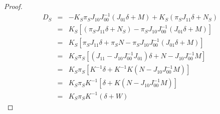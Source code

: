 \documentclass[12pt]{article}
\theoremstyle{definition}
\begin{document}
\begin{proof}
	\begin{eqnarray*}
		D_S &=& -K_S \pi_S J_{10}J_{00}^{-1}\left(J_{01}\delta + M\right) + K_S \left(\pi_S J_{11}\delta + N_S \right)\\
			&=& K_S \left[ \left(\pi_S J_{11}\delta + N_S \right) - \pi_S J_{10}J_{00}^{-1}\left(J_{01}\delta + M\right) \right]\\
			&=& K_S \left[ \pi_S J_{11}\delta + \pi_S N  - \pi_S J_{10}J_{00}^{-1}\left(J_{01}\delta + M\right) \right]\\
			&=& K_S \pi_S \left[ \left(J_{11} - J_{10}J_{00}^{-1}J_{01}\right)\delta +  N  -  J_{10}J_{00}^{-1} M \right]\\
		&=& K_S \pi_S \left[ K^{-1}\delta +K^{-1}K  \left(N  -  J_{10}J_{00}^{-1} M \right)\right]\\
		&=& K_S \pi_S K^{-1} \left[ \delta +K  \left(N  -  J_{10}J_{00}^{-1} M \right)\right]\\
		&=& K_S \pi_S K^{-1} \left( \delta + W\right)
	\end{eqnarray*}
\end{proof}
\end{document}
